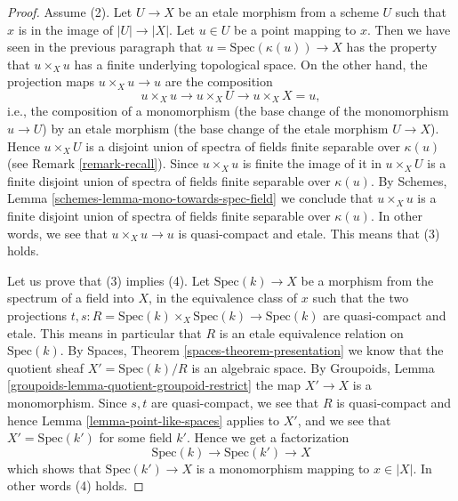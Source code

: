 \begin{proof}
\medskip\noindent
Assume (2). Let $U \to X$ be an etale morphism from a scheme $U$
such that $x$ is in the image of $|U| \to |X|$. Let $u \in U$ be
a point mapping to $x$. Then we have seen in the previous
paragraph that $u = \text{Spec}(\kappa(u)) \to X$ has the property that
$u \times_X u$ has a finite underlying topological space. On the other
hand, the projection maps $u \times_X u \to u$ are the composition
$$
u \times_X u \longrightarrow
u \times_X U \longrightarrow
u \times_X X = u,
$$
i.e., the composition of a monomorphism (the base change of the monomorphism
$u \to U$) by an etale morphism (the base change of the etale morphism
$U \to X$). Hence $u \times_X U$ is a disjoint union of spectra of fields
finite separable over $\kappa(u)$ (see
Remark \ref{remark-recall}). Since $u \times_X u$ is finite the image
of it in $u \times_X U$ is a finite disjoint union of spectra of fields
finite separable over $\kappa(u)$. By
Schemes, Lemma \ref{schemes-lemma-mono-towards-spec-field}
we conclude that $u \times_X u$ is a finite disjoint union of spectra
of fields finite separable over $\kappa(u)$. In other words, we see that
$u \times_X u \to u$ is quasi-compact and etale. This means that (3) holds.

\medskip\noindent
Let us prove that (3) implies (4). Let $\text{Spec}(k) \to X$ be a morphism
from the spectrum of a field into $X$, in the equivalence class of $x$
such that the two projections
$t, s : R = \text{Spec}(k) \times_X \text{Spec}(k)  \to \text{Spec}(k)$
are quasi-compact and etale.
This means in particular
that $R$ is an etale equivalence relation on $\text{Spec}(k)$.
By Spaces, Theorem \ref{spaces-theorem-presentation}
we know that the quotient sheaf
$X' = \text{Spec}(k)/R$ is an algebraic space. By
Groupoids, Lemma \ref{groupoids-lemma-quotient-groupoid-restrict}
the map $X' \to X$ is a monomorphism.
Since $s, t$ are quasi-compact, we see that $R$ is quasi-compact and hence
Lemma \ref{lemma-point-like-spaces} applies to $X'$, and we see that
$X' = \text{Spec}(k')$ for some field $k'$. Hence we get a factorization
$$
\text{Spec}(k) \longrightarrow
\text{Spec}(k') \longrightarrow X
$$
which shows that $\text{Spec}(k') \to X$ is a monomorphism mapping
to $x \in |X|$. In other words (4) holds.


\end{proof}

